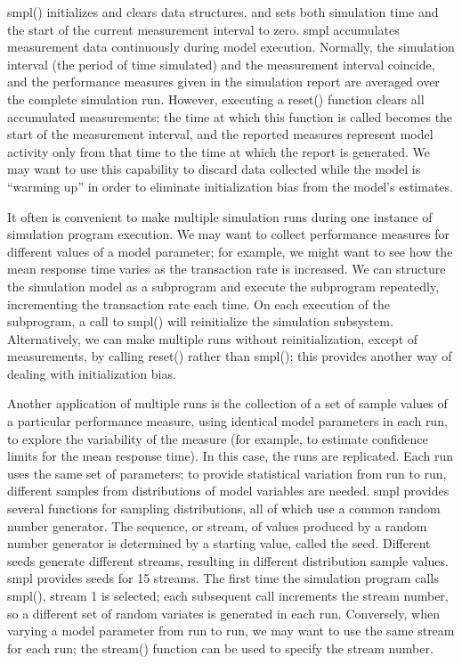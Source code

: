 smpl() initializes and clears data structures, and sets both simulation time
and the start of the current measurement interval to zero. smpl accumulates
measurement data continuously during model execution. Normally, the
simulation interval (the period of time simulated) and the measurement
interval coincide, and the performance measures given in the simulation report
are averaged over the complete simulation run. However, executing a reset()
function clears all accumulated measurements; the time at which this function
is called becomes the start of the measurement interval, and the reported
measures represent model activity only from that time to the time at which the
report is generated. We may want to use this capability to discard data
collected while the model is ``warming up'' in order to eliminate
initialization bias from the model's estimates.

It often is convenient to make multiple simulation runs during one instance of
simulation program execution. We may want to collect performance measures for
different values of a model parameter; for example, we might want to see how
the mean response time varies as the transaction rate is increased. We can
structure the simulation model as a subprogram and execute the subprogram
repeatedly, incrementing the transaction rate each time. On each execution of
the subprogram, a call to smpl() will reinitialize the simulation subsystem.
Alternatively, we can make multiple runs without reinitialization, except of
measurements, by calling reset() rather than smpl(); this provides another way
of dealing with initialization bias.

Another application of multiple runs is the collection of a set of sample
values of a particular performance measure, using identical model parameters
in each run, to explore the variability of the measure (for example, to
estimate confidence limits for the mean response time). In this case, the runs
are replicated. Each run uses the same set of parameters; to provide
statistical variation from run to run, different samples from distributions of
model variables are needed. smpl provides several functions for sampling
distributions, all of which use a common random number generator. The
sequence, or stream, of values produced by a random number generator is
determined by a starting value, called the seed. Different seeds generate
different streams, resulting in different distribution sample values. smpl
provides seeds for 15 streams. The first time the simulation program calls
smpl(), stream 1 is selected; each subsequent call increments the stream
number, so a different set of random variates is generated in each run.
Conversely, when varying a model parameter from run to run, we may want
\noindent to use the same stream for each run; the stream() function can be used to specify
the stream number.

